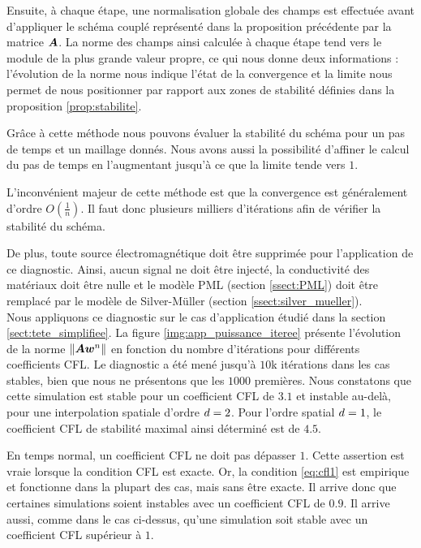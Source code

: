 Ensuite, à chaque étape, une normalisation globale des champs est effectuée avant d'appliquer
le schéma couplé représenté dans la proposition précédente par la matrice $\bm{A}$.
La norme des champs ainsi calculée à chaque étape tend vers le module de la plus grande valeur
propre, ce qui nous donne deux informations :
l'évolution de la norme nous indique l'état de la convergence et
la limite nous permet de nous positionner par rapport aux zones de stabilité
définies dans la proposition \ref{prop:stabilite}.

Grâce à cette méthode nous pouvons évaluer la stabilité du schéma pour
un pas de temps et un maillage donnés.
Nous avons aussi la possibilité d'affiner le calcul du pas de temps en l'augmentant jusqu'à
ce que la limite tende vers $1$.

L'inconvénient majeur de cette méthode est que la convergence est généralement
d'ordre $O(\frac{1}{n})$.
Il faut donc plusieurs milliers d'itérations afin de vérifier la stabilité du schéma.

De plus, toute source électromagnétique doit être supprimée pour l'application de ce diagnostic.
Ainsi, aucun signal ne doit être injecté, la conductivité des matériaux doit
être nulle et le modèle PML (section \ref{ssect:PML}) doit être remplacé
par le modèle de Silver-Müller (section \ref{ssect:silver_mueller}).
\\

Nous appliquons ce diagnostic sur le cas d'application étudié dans la section
\ref{sect:tete_simplifiee}. La figure \ref{img:app_puissance_iteree} présente l'évolution de la norme
$\left\Vert\bm{A} \bm{w}^n\right\Vert$
en fonction du nombre d'itérations pour différents coefficients CFL.
Le diagnostic a été mené jusqu'à
$10$k itérations dans les cas stables, bien que nous ne présentons
que les $1000$ premières.
Nous constatons que cette simulation est stable pour un coefficient CFL
de $3.1$ et instable au-delà, pour une interpolation spatiale d'ordre $d=2$.
Pour l'ordre spatial $d=1$, le coefficient CFL de stabilité maximal
ainsi déterminé est de $4.5$.


\begin{remark}
	En temps normal, un coefficient CFL ne doit pas dépasser $1$. Cette assertion
	est vraie lorsque la condition CFL est exacte. Or, la condition
	\eqref{eq:cfl1} est empirique et fonctionne dans la plupart des cas,
	mais sans être exacte. Il arrive donc que certaines simulations soient
	instables avec un coefficient CFL de $0.9$.
	Il arrive aussi, comme dans le cas ci-dessus, qu'une simulation soit
	stable avec un coefficient CFL supérieur à $1$.
\end{remark}






